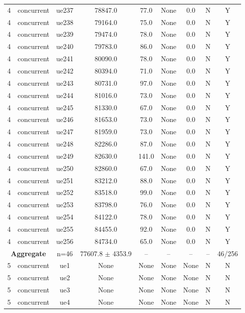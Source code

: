 \begin{table}[ht]
\begin{tabular}{|c|c|c|c|c|c|c|c|c|}
4 & concurrent & ue237 & 78847.0 & 77.0 & None & 0.0 & N & Y \\
4 & concurrent & ue238 & 79164.0 & 75.0 & None & 0.0 & N & Y \\
4 & concurrent & ue239 & 79474.0 & 78.0 & None & 0.0 & N & Y \\
4 & concurrent & ue240 & 79783.0 & 86.0 & None & 0.0 & N & Y \\
4 & concurrent & ue241 & 80090.0 & 78.0 & None & 0.0 & N & Y \\
4 & concurrent & ue242 & 80394.0 & 71.0 & None & 0.0 & N & Y \\
4 & concurrent & ue243 & 80731.0 & 97.0 & None & 0.0 & N & Y \\
4 & concurrent & ue244 & 81016.0 & 73.0 & None & 0.0 & N & Y \\
4 & concurrent & ue245 & 81330.0 & 67.0 & None & 0.0 & N & Y \\
4 & concurrent & ue246 & 81653.0 & 73.0 & None & 0.0 & N & Y \\
4 & concurrent & ue247 & 81959.0 & 73.0 & None & 0.0 & N & Y \\
4 & concurrent & ue248 & 82286.0 & 87.0 & None & 0.0 & N & Y \\
4 & concurrent & ue249 & 82630.0 & 141.0 & None & 0.0 & N & Y \\
4 & concurrent & ue250 & 82860.0 & 67.0 & None & 0.0 & N & Y \\
4 & concurrent & ue251 & 83212.0 & 88.0 & None & 0.0 & N & Y \\
4 & concurrent & ue252 & 83518.0 & 99.0 & None & 0.0 & N & Y \\
4 & concurrent & ue253 & 83798.0 & 76.0 & None & 0.0 & N & Y \\
4 & concurrent & ue254 & 84122.0 & 78.0 & None & 0.0 & N & Y \\
4 & concurrent & ue255 & 84455.0 & 92.0 & None & 0.0 & N & Y \\
4 & concurrent & ue256 & 84734.0 & 65.0 & None & 0.0 & N & Y \\
\multicolumn{2}{|c|}{\textbf{Aggregate}} & n=46 & 77607.8 $\pm$ 4353.9 & -- & -- & -- & -- & 46/256 \\
\hline
5 & concurrent & ue1 & None & None & None & None & N & N \\
5 & concurrent & ue2 & None & None & None & None & N & N \\
5 & concurrent & ue3 & None & None & None & None & N & N \\
5 & concurrent & ue4 & None & None & None & None & N & N \\

\end{tabular}
\end{table}
